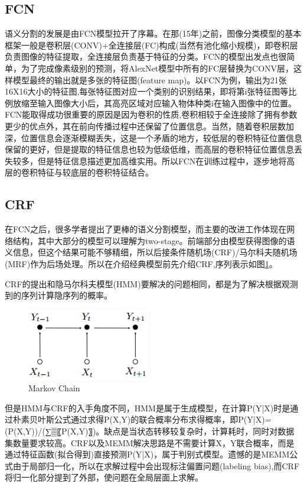 \documentclass{article}
\begin{document}
\begin{CJK}{UTF8}{gbsn}
\subsection{FCN}
语义分割的发展是由FCN\cite{long2015fully}模型拉开了序幕。在那(15年)之前，图像分类模型的基本框架一般是卷积层(CONV)+全连接层(FC)构成(当然有池化缩小规模)，即卷积层负责图像的特征提取，全连接层负责基于特征的分类。FCN\cite{long2015fully}的模型出发点也很简单，为了完成像素级别的预测，将AlexNet\cite{krizhevsky2012imagenet}模型中所有的FC层替换为CONV层，这样模型最终的输出就是多张的特征图(feature map)。以FCN\cite{long2015fully}为例，输出为21张16X16大小的特征图,每张特征图对应一个类别的识别结果，即将第i张特征图等比例放缩至输入图像大小后，其高亮区域对应输入物体种类i在输入图像中的位置。FCN\cite{long2015fully}能取得成功很重要的原因是因为卷积的性质,卷积相较于全连接除了拥有参数更少的优点外，其在前向传播过程中还保留了位置信息。当然，随着卷积层数加深，位置信息会逐渐模糊丢失，这是一个矛盾的地方，较低层的卷积特征位置信息保留的更好，但是提取的特征信息也较为低级低维，而高层的卷积特征位置信息丢失较多，但是特征信息描述更加高维实用。所以FCN\cite{long2015fully}在训练过程中，逐步地将高层的卷积特征与较底层的卷积特征结合。

\subsection{CRF}
在FCN\cite{long2015fully}之后，很多学者提出了更棒的语义分割模型，而主要的改进工作体现在网络结构，其中大部分的模型可以理解为two-stage。前端部分由模型获得图像的语义信息，但这个结果可能不够精细，所以后接条件随机场(CRF\cite{lafferty2001conditional})/马尔科夫随机场(MRF\cite{krahenbuhl2011efficient})作为后场处理。所以在介绍经典模型前先介绍CRF\cite{lafferty2001conditional},序列表示如图\ref{Markov Chain}。

CRF\cite{lafferty2001conditional}的提出和隐马尔科夫模型(HMM)要解决的问题相同，都是为了解决根据观测到的序列计算隐序列的概率。
\begin{figure}[h]
    \centering
    \includegraphics[scale=0.7]{imgs//2-1_Markov_Chain}
    \caption{Markov Chain}
    \label{Markov Chain}
\end{figure}

但是HMM与CRF\cite{lafferty2001conditional}的入手角度不同，HMM是属于生成模型，在计算P(Y|X)时是通过朴素贝叶斯公式通过求得P(X,Y)的联合概率分布求得概率，即P(Y|X)=(P(X,Y))/(∑▒〖P(X,Y)〗)。缺点是当状态转移较复杂时，计算耗时，同时对数据集数量要求较高。CRF\cite{lafferty2001conditional}以及MEMM解决思路是不需要计算X，Y联合概率，而是通过特征函数(拟合得到)直接预测P(Y|X)，属于判别式模型。遗憾的是MEMM公式由于局部归一化，所以在求解过程中会出现标注偏置问题(labeling bias),而CRF\cite{lafferty2001conditional}将归一化部分提到了外部，使问题在全局层面上求解。
	

\end{CJK}
\end{document}
